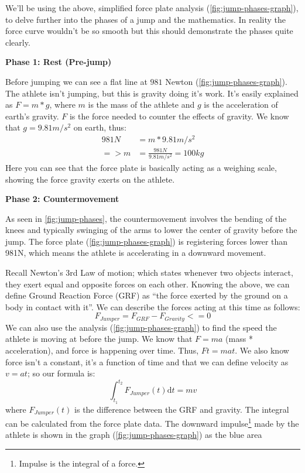 We'll be using the above, simplified force plate analysis (\cref{fig:jump-phases-graph}),
to delve further into the phases of a jump and the mathematics. 
In reality the force curve wouldn't be so smooth
but this should demonstrate the phases quite clearly.
\par
\textbf{Phase 1: Rest (Pre-jump)}
\par
Before jumping we can see a flat line at $981$ Newton (\cref{fig:jump-phases-graph}). The athlete isn't jumping, but this is gravity doing it's
work. It's easily explained as $F=m*g$, where $m$ is the mass of the athlete and
$g$ is the acceleration of earth's gravity. $F$ is the force needed to counter the effects of gravity. We know that $g=9.81m/s^2$ on earth, thus:
\[
	\displaystyle
	\begin{aligned}
	981N &= m * 9.81 m/s^2 \\
	=> m &= \frac{981N}{9.81 m/s^2} = 100kg
	\end{aligned}	
\]
Here you can see that the force plate is basically acting as a weighing scale, showing
the force gravity exerts on the athlete.
\par
\textbf{Phase 2: Countermovement}
\par
As seen in \cref{fig:jump-phases}, the countermovement involves
the bending of the knees and typically swinging of the arms to lower the center
of gravity before the jump. The force plate (\cref{fig:jump-phases-graph}) is 
registering forces lower than 981N, which means the athlete is accelerating
in a downward movement.
\par
Recall Newton's 3rd Law of motion; 
which states whenever two objects interact, they exert equal and opposite forces on each other.
Knowing the above, we can define Ground Reaction Force (GRF) as ``the force exerted by the ground
on a body in contact with it''. 
We can describe the forces acting at this time as follows:
$$F_{Jumper} = F_{GRF} - F_{Gravity} <=0$$
We can also use the analysis (\cref{fig:jump-phases-graph}) to find
the speed the athlete is moving at before the jump. We know that
$F=ma$ (mass * acceleration), and force is happening over time.
Thus, $Ft=mat$.  
We also know force isn't a constant, it's a function of time and that we can define velocity as $v=at$;
so our formula is:
$$\displaystyle
\int_{t_1}^{t_2} F_{Jumper}(t) \mathrm{d}t = mv$$
where $F_{Jumper}(t)$ is the difference between the GRF and gravity.
\pagebreak
The integral can be calculated from the force plate data. The downward impulse\footnote{Impulse is the integral of a force.} made by
the athlete is shown in the graph (\cref{fig:jump-phases-graph}) as the blue area
